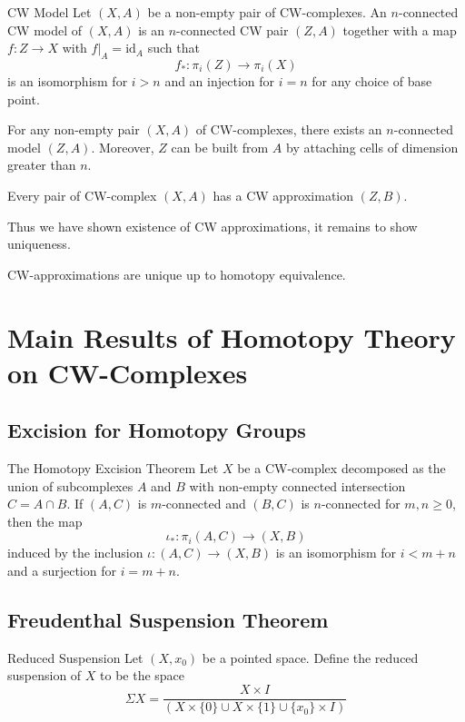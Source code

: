 \documentclass[a4paper]{article}
\begin{document}
\begin{defn}{CW Model}{} Let $(X,A)$ be a non-empty pair of CW-complexes. An $n$-connected CW model of $(X,A)$ is an $n$-connected CW pair $(Z,A)$ together with a map $f:Z\to X$ with $f|_A=\text{id}_A$ such that $$f_\ast:\pi_i(Z)\to\pi_i(X)$$ is an isomorphism for $i>n$ and an injection for $i=n$ for any choice of base point. 
\end{defn}

\begin{thm}{}{} For any non-empty pair $(X,A)$ of CW-complexes, there exists an $n$-connected model $(Z,A)$. Moreover, $Z$ can be built from $A$ by attaching cells of dimension greater than $n$. 
\end{thm}

\begin{crl}{}{} Every pair of CW-complex $(X,A)$ has a CW approximation $(Z,B)$. 
\end{crl}

Thus we have shown existence of CW approximations, it remains to show uniqueness. 

\begin{crl}{}{} CW-approximations are unique up to homotopy equivalence. 
\end{crl}

\pagebreak

\section{Main Results of Homotopy Theory on CW-Complexes}
\subsection{Excision for Homotopy Groups}
\begin{thm}{The Homotopy Excision Theorem}{} Let $X$ be a CW-complex decomposed as the union of subcomplexes $A$ and $B$ with non-empty connected intersection $C=A\cap B$. If $(A,C)$ is $m$-connected and $(B,C)$ is $n$-connected for $m,n\geq 0$, then the map $$\iota_\ast:\pi_i(A,C)\to(X,B)$$ induced by the inclusion $\iota:(A,C)\to(X,B)$ is an isomorphism for $i<m+n$ and a surjection for $i=m+n$. 
\end{thm}

\subsection{Freudenthal Suspension Theorem}
\begin{defn}{Reduced Suspension}{} Let $(X,x_0)$ be a pointed space. Define the reduced suspension of $X$ to be the space $$\Sigma X=\frac{X\times I}{(X\times\{0\}\cup X\times\{1\}\cup\{x_0\}\times I)}$$
\end{defn}
\end{document}
